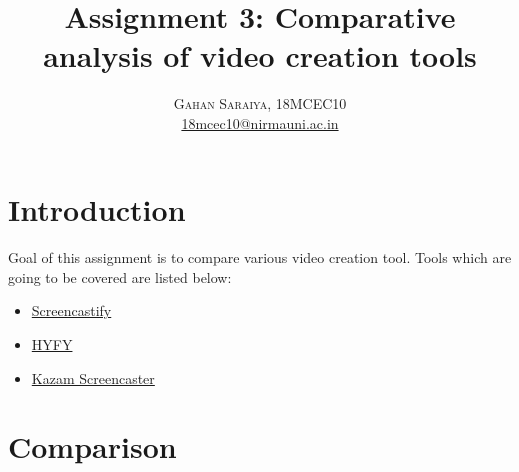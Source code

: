 \documentclass[paper=letter, fontsize=12pt]{article}
\title{\vspace{-15mm}\fontsize{16pt}{6pt}\selectfont Assignment 3: Comparative analysis of video creation tools} %
\author{
	\large
	{\textsc{Gahan Saraiya, 18MCEC10 }}\\[2mm]
	\normalsize \href{mailto:18mcec10@nirmauni.ac.in}{18mcec10@nirmauni.ac.in}\\[2mm] %
}
\date{}
\newcommand*\arrow{\item[$\Rightarrow$]}
\newcommand*{\screencastify}{\href{https://www.screencastify.com}{Screencastify}}
\newcommand*{\hyfy}{\href{https://www.hyfy.io}{HYFY}}
\newcommand*{\kazam}{\href{https://launchpad.net/kazam}{Kazam Screencaster}}
\begin{document}
	\maketitle %
	\thispagestyle{fancy} %
	
	
	\section{Introduction}
	\paragraph{} Goal of this assignment is to compare various video creation tool.
	Tools which are going to be covered are listed below:
	\begin{itemize}
		\arrow \screencastify
		\arrow \hyfy
		\arrow \kazam
	\end{itemize}
	
	\section{Comparison}
	
\end{document}
